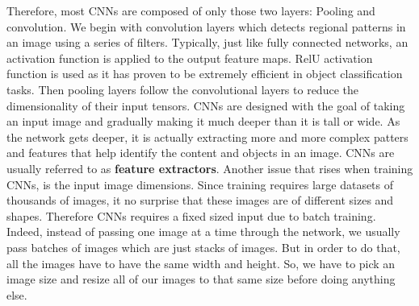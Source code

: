 Therefore, most CNNs are composed of only those two layers: Pooling and convolution. We begin with convolution layers which detects regional patterns
in an image using a series of filters. Typically, just like fully connected networks, an activation function is applied to the output feature maps.
RelU activation function is used as it has proven to be extremely efficient in object classification tasks. Then pooling layers follow the
convolutional layers to reduce the dimensionality of their input tensors. CNNs are designed with the goal of taking an input image and gradually
making it much deeper than it is tall or wide. As the network gets deeper, it is actually extracting more and more complex patters and features that
help identify the content and objects in an image. CNNs are usually referred to as \textbf{feature extractors}. Another issue that rises when
training CNNs, is the input image dimensions. Since training requires large datasets of thousands of images, it no surprise that these images
are of different sizes and shapes. Therefore CNNs requires a fixed sized input due to batch training. Indeed, instead of passing one image at a time
through the network, we usually pass batches of images which are just stacks of images. But in order to do that, all the images have to have the
same width and height. So, we have to pick an image size and resize all of our images to that same size before doing anything else.
